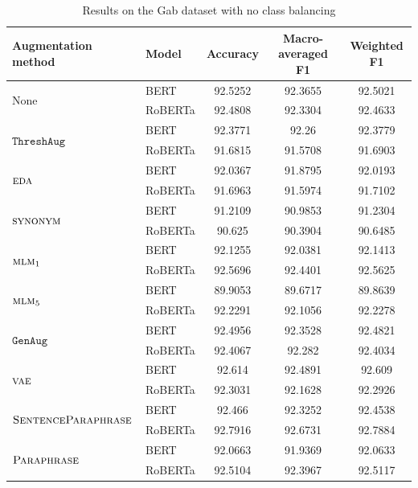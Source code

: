 \documentclass[11pt,a4paper]{article}
\newcommand{\noaug}{$\textrm{None}$}
\newcommand{\senttfpara}{$\textsc{SentenceParaphrase}$}
\newcommand{\tfpara}{$\textsc{Paraphrase}$}
\newcommand{\eda}{$\textsc{eda}$}
\newcommand{\synonym}{$\textsc{synonym}$}
\newcommand{\mlmone}{$\textsc{mlm}_1$}
\newcommand{\mlmfive}{$\textsc{mlm}_5$}
\newcommand{\genaug}{$\texttt{GenAug}$}
\newcommand{\threshaug}{$\texttt{ThreshAug}$}
\newcommand{\vae}{$\textsc{vae}$}
\begin{document}
\begin{table}[]
    \small
    \centering
    \begin{tabular}{llccc}
        \toprule
        \textbf{Augmentation method} & \textbf{Model} & \textbf{Accuracy} & \textbf{Macro-averaged F1} & \textbf{Weighted F1} \\
        \midrule
        \multirow{2}{*}{\noaug} & BERT & 92.5252 & 92.3655 & 92.5021 \\
         & RoBERTa & 92.4808 & 92.3304 & 92.4633 \\\midrule
        
         \multirow{2}{*}{\threshaug} & BERT & 92.3771 & 92.26 & 92.3779 \\
         & RoBERTa & 91.6815 & 91.5708 & 91.6903 \\\cmidrule{2-5}
        \multirow{2}{*}{\eda} & BERT & 92.0367 & 91.8795 & 92.0193 \\
         & RoBERTa & 91.6963 & 91.5974 & 91.7102 \\\midrule
         
        \multirow{2}{*}{\synonym} & BERT & 91.2109 & 90.9853 & 91.2304 \\
         & RoBERTa & 90.625 & 90.3904 & 90.6485 \\\cmidrule{2-5}
        \multirow{2}{*}{\mlmone} & BERT & 92.1255 & 92.0381 & 92.1413 \\
         & RoBERTa & 92.5696 & 92.4401 & 92.5625 \\\cmidrule{2-5}
        \multirow{2}{*}{\mlmfive} & BERT & 89.9053 & 89.6717 & 89.8639 \\
         & RoBERTa & 92.2291 & 92.1056 & 92.2278 \\\midrule
         
         \multirow{2}{*}{\genaug} & BERT & 92.4956 & 92.3528 & 92.4821 \\
         & RoBERTa & 92.4067 & 92.282 & 92.4034 \\\cmidrule{2-5}
        \multirow{2}{*}{\vae} & BERT & 92.614 & 92.4891 & 92.609 \\
        & RoBERTa & 92.3031 & 92.1628 & 92.2926 \\\midrule
        
        \multirow{2}{*}{\senttfpara} & BERT & 92.466 & 92.3252 & 92.4538 \\
         & RoBERTa & 92.7916 & 92.6731 & 92.7884 \\\cmidrule{2-5}
        \multirow{2}{*}{\tfpara} & BERT & 92.0663 & 91.9369 & 92.0633 \\
         & RoBERTa & 92.5104 & 92.3967 & 92.5117 \\
        \bottomrule
    \end{tabular}
    \caption{Results on the Gab dataset with no class balancing}
    \label{tab:gab0}
\end{table}
\end{document}
